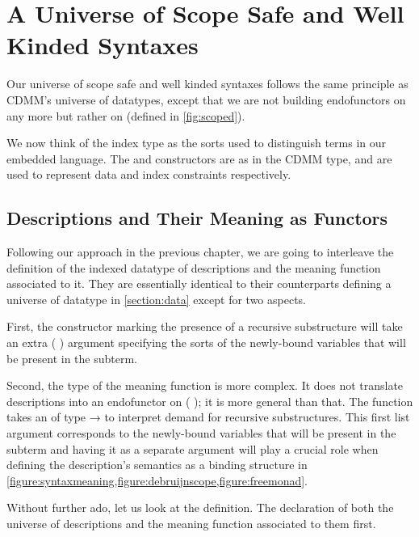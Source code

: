 \chapter{A Universe of Scope Safe and Well Kinded Syntaxes}
\label{chapter:universe}

Our universe of scope safe and well kinded syntaxes follows the same
principle as CDMM's universe of datatypes, except that we are not
building endofunctors on  any more but rather on
{ } (defined in \cref{fig:scoped}).

We now think of the index type  as the sorts used to distinguish
terms in our embedded language. The  and 
constructors are as in the CDMM  type, and are used to represent
data and index constraints respectively.

\section{Descriptions and Their Meaning as Functors}

Following our approach in the previous chapter, we are going to interleave
the definition of the indexed datatype of descriptions and the meaning
function  associated to it. They are essentially identical to
their counterparts defining a universe of datatype in \cref{section:data}
except for two aspects.

First, the constructor marking the presence of a recursive substructure
will take an extra {( )} argument specifying the sorts of
the newly-bound variables that will be present in the subterm.

Second, the type of the meaning function is more complex. It does not
translate descriptions into an endofunctor on {( )};
it is more general than that. The function takes an  of type
{  →  } to interpret demand for
recursive substructures. This first list argument corresponds to the
newly-bound variables that will be present in the subterm and having
it as a separate argument will play a crucial role when defining the
description's semantics as a binding structure in
\cref{figure:syntaxmeaning,figure:debruijnscope,figure:freemonad}.

Without further ado, let us look at the definition. The declaration
of both the universe of descriptions and the meaning function associated
to them first.

\begin{AgdaSuppressSpace}
\end{AgdaSuppressSpace}


